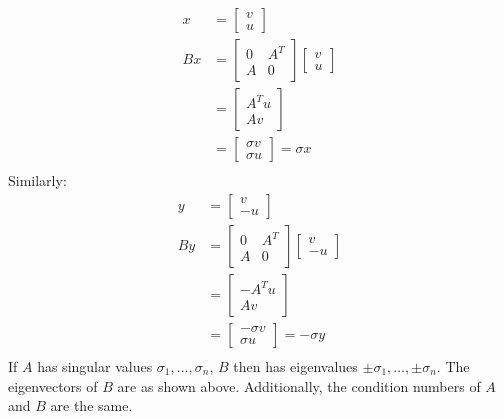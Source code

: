 \documentclass{article}
\begin{document}
\begin{align*}
    x & = \begin{bmatrix}
        v \\ u
    \end{bmatrix} \\
    Bx & = \begin{bmatrix}
    0 & A^T \\ A & 0
    \end{bmatrix}\begin{bmatrix}
        v \\ u
    \end{bmatrix} \\
    & = \begin{bmatrix}
        A^Tu \\ Av
    \end{bmatrix} \\
    & = \begin{bmatrix}
        \sigma v \\ \sigma u
    \end{bmatrix} = \sigma x \\
\end{align*}
Similarly:
\begin{align*}
    y & = \begin{bmatrix}
        v \\ -u
    \end{bmatrix} \\
    By & = \begin{bmatrix}
    0 & A^T \\ A & 0
    \end{bmatrix}\begin{bmatrix}
        v \\ -u
    \end{bmatrix} \\
    & = \begin{bmatrix}
        -A^Tu \\ Av
    \end{bmatrix} \\
    & = \begin{bmatrix}
        -\sigma v \\ \sigma u
    \end{bmatrix} = -\sigma y \\
\end{align*}
If $A$ has singular values $\sigma_1, \ldots, \sigma_n$, $B$ then has eigenvalues $\pm\sigma_1, \ldots, \pm\sigma_n$. The eigenvectors of $B$ are as shown above. Additionally, the condition numbers of $A$ and $B$ are the same.
\end{document}
